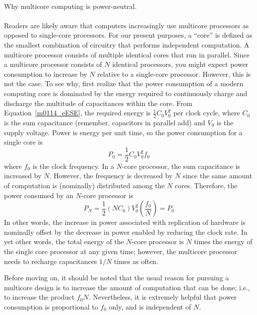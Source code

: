 
~\\ \begin{example} 
\label{m0114_eMulticore}
\begin{mdframed}[backgroundcolor=brown!20,linecolor=brown!20]\raggedright
Why multicore computing is power-neutral.
\\~\\
Readers are likely aware that computers increasingly use multicore processors as opposed to single-core processors.
For our present purposes, a ``core'' is defined as the smallest combination of circuitry that performs independent computation.
A multicore processor consists of multiple identical cores that run in parallel.
Since a multicore processor consists of $N$ identical processors, you might expect power consumption to increase by $N$ relative to a single-core processor.
However, this is not the case.
To see why, first realize that the power consumption of a modern computing core is dominated by the energy required to continuously charge and discharge the multitude of capacitances within the core.  
From Equation~\ref{m0114_eESE}, the required energy is $\frac{1}{2}C_0V_0^2$ per clock cycle, where $C_0$ is the sum capacitance (remember, capacitors in parallel add) and $V_0$ is the supply voltage. Power is energy per unit time, so the power consumption for a single core is 
%
\begin{equation}
P_0 = \frac{1}{2}C_0V_0^2f_0
\end{equation}
%
where $f_0$ is the clock frequency.
In a $N$-core processor, the sum capacitance is increased by $N$.
However, the frequency is decreased by $N$ since the same amount of computation is (nominally) distributed among the $N$ cores.
Therefore, the power consumed by an $N$-core processor is
%
\begin{equation}
P_N = \frac{1}{2}\left(NC_0\right)V_0^2\left(\frac{f_0}{N}\right) = P_0 
\end{equation}
%
In other words, the increase in power associated with replication of hardware is nominally offset by the decrease in power enabled by reducing the clock rate.
In yet other words, the total energy of the $N$-core processor is $N$ times the energy of the single core processor at any given time; however, the multicore processor needs to recharge capacitances $1/N$ times as often.  

Before moving on, it should be noted that the usual reason for pursuing a multicore design is to increase the amount of computation that can be done; i.e., to increase the product $f_0 N$.   Nevertheless, it is extremely helpful that power consumption is proportional to $f_0$ only, and is independent of $N$.
\end{mdframed}\end{example}

